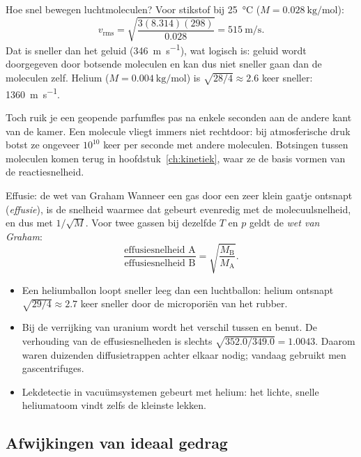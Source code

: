 \begin{voorbeeld}{Hoe snel bewegen luchtmoleculen?}
Voor stikstof bij \SI{25}{\celsius} ($M = \SI{0.028}{\kilo\gram\per\mole}$):
\[
v_\mathrm{rms} = \sqrt{\frac{3(8.314)(298)}{0.028}} = \SI{515}{\metre\per\second}.
\]
Dat is sneller dan het geluid (\SI{346}{\metre\per\second}), wat logisch is: geluid wordt doorgegeven door botsende moleculen en kan dus niet sneller gaan dan de moleculen zelf. Helium ($M = \SI{0.004}{\kilo\gram\per\mole}$) is $\sqrt{28/4}\approx 2.6$ keer sneller: \SI{1360}{\metre\per\second}.

Toch ruik je een geopende parfumfles pas na enkele seconden aan de andere kant van de kamer. Een molecule vliegt immers niet rechtdoor: bij atmosferische druk botst ze ongeveer $10^{10}$ keer per seconde met andere moleculen. Botsingen tussen moleculen komen terug in hoofdstuk~\ref{ch:kinetiek}, waar ze de basis vormen van de reactiesnelheid.
\end{voorbeeld}

\begin{toepassing}{Effusie: de wet van Graham}
Wanneer een gas door een zeer klein gaatje ontsnapt (\emph{effusie}), is de snelheid waarmee dat gebeurt evenredig met de molecuulsnelheid, en dus met $1/\sqrt{M}$. Voor twee gassen bij dezelfde $T$ en $p$ geldt de \emph{wet van Graham}:
\begin{equation}
\frac{\text{effusiesnelheid A}}{\text{effusiesnelheid B}} = \sqrt{\frac{M_\mathrm{B}}{M_\mathrm{A}}}.
\end{equation}
\begin{itemize}
\item Een heliumballon loopt sneller leeg dan een luchtballon: helium ontsnapt $\sqrt{29/4}\approx 2.7$ keer sneller door de microporiën van het rubber.
\item Bij de verrijking van uranium wordt het verschil tussen  en  benut. De verhouding van de effusiesnelheden is slechts $\sqrt{352.0/349.0} = 1.0043$. Daarom waren duizenden diffusietrappen achter elkaar nodig; vandaag gebruikt men gascentrifuges.
\item Lekdetectie in vacu\"umsystemen gebeurt met helium: het lichte, snelle heliumatoom vindt zelfs de kleinste lekken.
\end{itemize}
\end{toepassing}

\subsection{Afwijkingen van ideaal gedrag}

